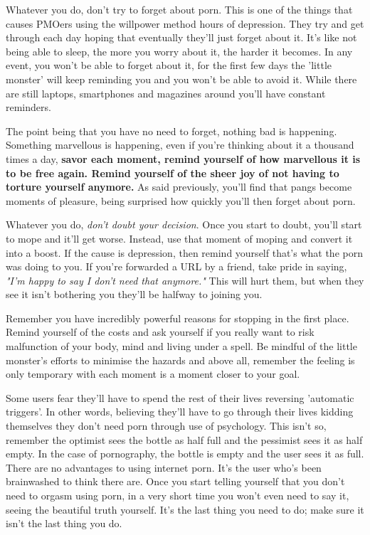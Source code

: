 \documentclass[easypeasy.tex]{subfiles}
\begin{document}
Whatever you do, don't try to forget about porn. This is one of the things that causes PMOers using the willpower method hours of depression. They try and get through each day hoping that eventually they'll just forget about it. It's like not being able to sleep, the more you worry about it, the harder it becomes. In any event, you won't be able to forget about it, for the first few days the 'little monster' will keep reminding you and you won't be able to avoid it. While there are still laptops, smartphones and magazines around you'll have constant reminders.

The point being that you have no need to forget, nothing bad is happening. Something marvellous is happening, even if you're thinking about it a thousand times a day, \textbf{savor each moment, remind yourself of how marvellous it is to be free again. Remind yourself of the sheer joy of not having to torture yourself anymore.} As said previously, you'll find that pangs become moments of pleasure, being surprised how quickly you'll then forget about porn.

Whatever you do, \textit{don't doubt your decision}. Once you start to doubt, you'll start to mope and it'll get worse. Instead, use that moment of moping and convert it into a boost. If the cause is depression, then remind yourself that's what the porn was doing to you. If you're forwarded a URL by a friend, take pride in saying, \textit{"I'm happy to say I don't need that anymore."} This will hurt them, but when they see it isn't bothering you they'll be halfway to joining you.

Remember you have incredibly powerful reasons for stopping in the first place. Remind yourself of the costs and ask yourself if you really want to risk malfunction of your body, mind and living under a spell. Be mindful of the little monster's efforts to minimise the hazards and above all, remember the feeling is only temporary with each moment is a moment closer to your goal.

Some users fear they'll have to spend the rest of their lives reversing 'automatic triggers'. In other words, believing they'll have to go through their lives kidding themselves they don't need porn through use of psychology. This isn't so, remember the optimist sees the bottle as half full and the pessimist sees it as half empty. In the case of pornography, the bottle is empty and the user sees it as full. There are no advantages to using internet porn. It's the user who's been brainwashed to think there are. Once you start telling yourself that you don't need to orgasm using porn, in a very short time you won't even need to say it, seeing the beautiful truth yourself. It's the last thing you need to do; make sure it isn't the last thing you do.
\end{document}

